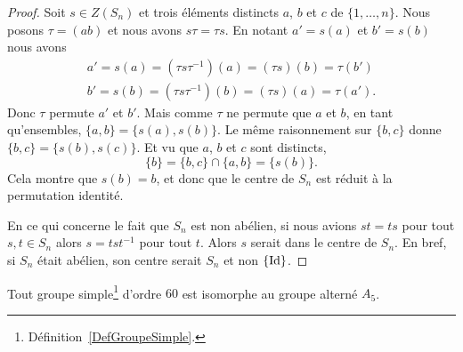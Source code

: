 \begin{proof}
    Soit \( s\in Z(S_n)\) et trois éléments distincts \( a\),  \( b\) et \( c\) de \( \{ 1,\ldots, n \}\). Nous posons \( \tau=(ab)\) et nous avons \( s\tau=\tau s\). En notant \( a'=s(a)\) et \( b'=s(b)\) nous avons
    \begin{subequations}
        \begin{align}
            a'=s(a)=(\tau s\tau^{-1})(a)=(\tau s)(b)=\tau(b')\\
            b'=s(b)=(\tau s\tau^{-1})(b)=(\tau s)(a)=\tau(a').
        \end{align}
    \end{subequations}
    Donc \( \tau\) permute \( a'\) et \( b'\). Mais comme \( \tau\) ne permute que \( a\) et \( b\), en tant qu'ensembles, \( \{ a,b \}=\{ s(a), s(b) \}\). Le même raisonnement sur \( \{ b,c \}\) donne $\{ b,c \}=\{ s(b),s(c) \}$. Et vu que \( a\), \( b\) et \( c\) sont distincts,
    \begin{equation}
        \{ b \}=\{ b,c \}\cap\{ a,b \}=\{ s(b) \}.
    \end{equation}
    Cela montre que \( s(b)=b\), et donc que le centre de \( S_n\) est réduit à la permutation identité.

    En ce qui concerne le fait que \( S_n\) est non abélien, si nous avions \( st=ts\) pour tout \( s,t\in S_n\) alors \( s=tst^{-1}\) pour tout \( t\). Alors \( s\) serait dans le centre de \( S_n\). En bref, si \( S_n\) était abélien, son centre serait \( S_n\) et non \( \{ \operatorname{Id} \}\).

\end{proof}

\begin{proposition}        \label{PROPooUBIWooTrfCat}
    Tout groupe simple\footnote{Définition~\ref{DefGroupeSimple}.} d'ordre \( 60\) est isomorphe au groupe alterné \( A_5\).
\end{proposition}

